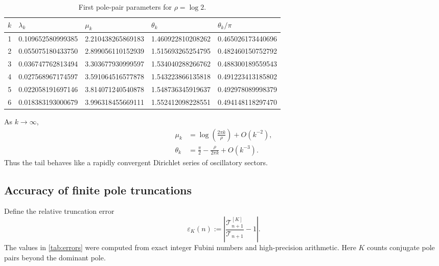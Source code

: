 \documentclass[11pt,oneside]{article}
\numberwithin{equation}{section}
\newcommand{\abs}[1]{\left|#1\right|}
\newcommand{\paren}[1]{\left(#1\right)}
\begin{document}
\begin{table}[ht]
\centering
\small
\caption{First pole-pair parameters for \(\rho=\log2\).}
\label{tab:actions}
\begin{tabular}{@{}rllll@{}}
\toprule
\(k\) & \(\lambda_k\) & \(\mu_k\) & \(\theta_k\) & \(\theta_k/\pi\)\\
\midrule
1 & 0.109652580999385 & 2.210438265869183 & 1.460922810208262 & 0.465026173440696\\
2 & 0.055075180433750 & 2.899056110152939 & 1.515693265254795 & 0.482460150752792\\
3 & 0.036747762813494 & 3.303677930999597 & 1.534040288266762 & 0.488300189559543\\
4 & 0.027568967174597 & 3.591064516577878 & 1.543223866135818 & 0.491223413185802\\
5 & 0.022058191697146 & 3.814071240540878 & 1.548736345919637 & 0.492978089998379\\
6 & 0.018383193000679 & 3.996318455669111 & 1.552412098228551 & 0.494148118297470\\
\bottomrule
\end{tabular}
\end{table}

As \(k\to\infty\),
\begin{align}
 \mu_k&=\log\!\paren{\frac{2\pi k}{\rho}}+O(k^{-2}),
 \label{eq:mu-large-k}\\
 \theta_k&=\frac\pi2-\frac{\rho}{2\pi k}+O(k^{-3}).
 \label{eq:theta-large-k}
\end{align}
Thus the tail behaves like a rapidly convergent Dirichlet series of oscillatory sectors.

\subsection{Accuracy of finite pole truncations}

Define the relative truncation error
\begin{equation}
 \varepsilon_K(n):=
 \abs{\frac{\mathscr T_{n+1}^{[K]}}{\mathscr T_{n+1}}-1}.
 \label{eq:relative-truncation-error}
\end{equation}
The values in \cref{tab:errors} were computed from exact integer Fubini numbers and high-precision arithmetic.  Here \(K\) counts conjugate pole pairs beyond the dominant pole.
\end{document}
